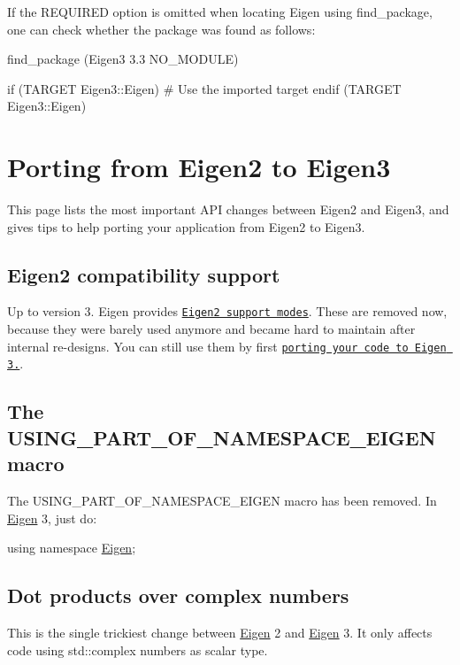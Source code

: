If the {\ttfamily R\+E\+Q\+U\+I\+R\+ED} option is omitted when locating Eigen using {\ttfamily find\+\_\+package}, one can check whether the package was found as follows\+: 
\begin{DoxyCode}
find\_package (Eigen3 3.3 NO\_MODULE)

if (TARGET Eigen3::Eigen)
  # Use the imported target
endif (TARGET Eigen3::Eigen)
\end{DoxyCode}
 \hypertarget{Eigen2ToEigen3}{}\section{Porting from Eigen2 to Eigen3}\label{Eigen2ToEigen3}
This page lists the most important A\+PI changes between Eigen2 and Eigen3, and gives tips to help porting your application from Eigen2 to Eigen3.\hypertarget{_eigen2_to_eigen3_CompatibilitySupport}{}\subsection{Eigen2 compatibility support}\label{_eigen2_to_eigen3_CompatibilitySupport}
Up to version 3. Eigen provides \href{http://eigen.tuxfamily.org/dox-3.2/Eigen2SupportModes.html}{\tt Eigen2 support modes}. These are removed now, because they were barely used anymore and became hard to maintain after internal re-\/designs. You can still use them by first \href{http://eigen.tuxfamily.org/dox-3.2/Eigen2ToEigen3.html}{\tt porting your code to Eigen 3.}.\hypertarget{_eigen2_to_eigen3_Using}{}\subsection{The U\+S\+I\+N\+G\+\_\+\+P\+A\+R\+T\+\_\+\+O\+F\+\_\+\+N\+A\+M\+E\+S\+P\+A\+C\+E\+\_\+\+E\+I\+G\+E\+N macro}\label{_eigen2_to_eigen3_Using}
The U\+S\+I\+N\+G\+\_\+\+P\+A\+R\+T\+\_\+\+O\+F\+\_\+\+N\+A\+M\+E\+S\+P\+A\+C\+E\+\_\+\+E\+I\+G\+EN macro has been removed. In \hyperlink{namespace_eigen}{Eigen} 3, just do\+: 
\begin{DoxyCode}
\textcolor{keyword}{using namespace }\hyperlink{namespace_eigen}{Eigen};
\end{DoxyCode}
\hypertarget{_eigen2_to_eigen3_ComplexDot}{}\subsection{Dot products over complex numbers}\label{_eigen2_to_eigen3_ComplexDot}
This is the single trickiest change between \hyperlink{namespace_eigen}{Eigen} 2 and \hyperlink{namespace_eigen}{Eigen} 3. It only affects code using {\ttfamily std\+::complex} numbers as scalar type.

